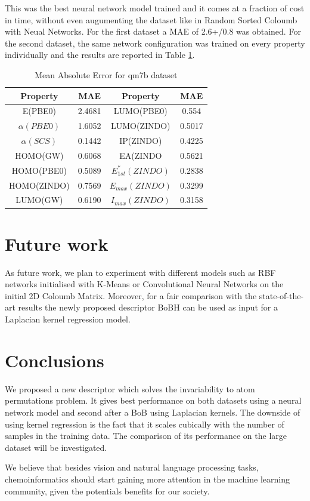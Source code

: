 \documentclass{article}
\begin{document}
This was the best neural network model trained and it comes at a fraction of cost in time, without even augumenting the dataset like in Random Sorted Coloumb with Neual Networks.
	For the first dataset a MAE of 2.6+/0.8 was obtained.
	For the second dataset, the same network configuration was trained on every property individually and the results are reported in Table \ref{resultstable}.

 \begin{table}
 	\centering
\caption{Mean Absolute Error for qm7b dataset}
\label{resultstable}
 \begin{tabular}{cc | cc}
 \hline
 \hline
 Property & MAE&Property& MAE\\
 \hline
E(PBE0)&  2.4681 &  LUMO(PBE0) &  0.554\\
 $\alpha (PBE0)$ & 1.6052  & LUMO(ZINDO)&  0.5017 \\
 $\alpha (SCS)$ & 0.1442 &IP(ZINDO)&  0.4225 \\
 HOMO(GW)& 0.6068 &  EA(ZINDO&  0.5621  \\
  HOMO(PBE0) & 0.5089 &$E^*_{1st}(ZINDO)$ & 0.2838 \\
  HOMO(ZINDO)& 0.7569 & $E_{max}(ZINDO)$&  0.3299\\
  LUMO(GW)&  0.6190&    $I_{max}(ZINDO)$&  0.3158

 \end{tabular}
 \end{table}
 
\section{Future work}
As future work, we plan to experiment with different models such as RBF networks initialised with K-Means or Convolutional Neural Networks on the initial 2D Coloumb Matrix. Moreover, for a fair comparison with the state-of-the-art results the newly proposed descriptor BoBH can be used as input for a Laplacian kernel regression model.

\section{Conclusions}
We proposed a new descriptor which solves the invariability to atom permutations problem. It gives best performance on both datasets using a neural network model and second after a BoB using Laplacian kernels. The downside of using kernel regression is the fact that it scales cubically with the number of samples in the training data. 
The comparison of its performance on the large dataset will be investigated.

We believe that besides vision and natural language processing tasks, chemoinformatics  should start gaining more attention  in the machine learning community, given the potentials benefits for our society.





\end{document}
